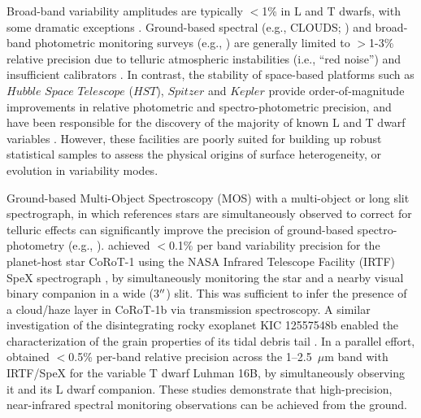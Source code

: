 \documentclass[twocolumn]{aastex6}
\begin{document}
Broad-band variability amplitudes are typically $<$1\% in L and T dwarfs, with some dramatic exceptions \citep{2009ApJ...701.1534A,2012ApJ...750..105R,2013A&A...555L...5G,2016ApJ...829L..32L}. 
Ground-based spectral (e.g., CLOUDS; \citealt{2008A&A...487..277G}) and broad-band photometric monitoring surveys (e.g., \citealt{1999A&A...348..800B,2003MNRAS.346..473K,2014ApJ...793...75R,2014A&A...566A.111W}) are generally limited to $>$1-3\% relative precision due to telluric atmospheric instabilities (i.e., ``red noise'') and insufficient calibrators \citep{2003MNRAS.339..477B}.
In contrast, the stability of space-based platforms such as $Hubble$ $Space$ $Telescope$ ($HST$), $Spitzer$ and $Kepler$ provide order-of-magnitude improvements in relative photometric and spectro-photometric precision, and have been responsible for the discovery of the majority of known L and T dwarf variables \citep{2013ApJ...768..121A,2013ApJ...779..172G,2015ApJ...799..154M}. However, these facilities are poorly suited for building up robust statistical samples to assess the physical origins of surface heterogeneity, or evolution in variability modes. 

Ground-based Multi-Object Spectroscopy (MOS) with a multi-object or long slit spectrograph, in which references stars are simultaneously observed to correct for telluric effects can significantly improve the precision of ground-based spectro-photometry (e.g., \citealt{bean10,bean2013,gibson13clouds,stevenson2016hatp26}). \citet{2014ApJ...783....5S} achieved $<$0.1\% per band variability precision for the planet-host star CoRoT-1 using the NASA Infrared Telescope Facility (IRTF) SpeX spectrograph \citep{2003PASP..115..362R}, by simultaneously monitoring the star and a nearby visual binary companion in a wide (3$\mbox{$^{\prime\prime}$}$) slit. This was sufficient to infer the presence of a cloud/haze layer in CoRoT-1b via transmission spectroscopy. A similar investigation of the disintegrating rocky exoplanet KIC 12557548b  enabled the characterization of the grain properties of its tidal debris tail \citep{2016ApJ...826..156S}. In a parallel effort, \citet{2014ApJ...785...48B} obtained $<$0.5\% per-band relative precision across the 1--2.5~$\mu$m band with IRTF/SpeX for the variable T dwarf Luhman 16B, by simultaneously observing it and its L dwarf companion. These studies demonstrate that high-precision, near-infrared spectral monitoring observations can be achieved from the ground.
\end{document}
